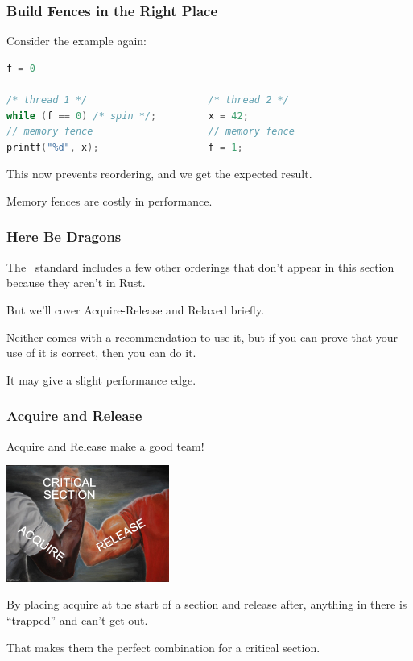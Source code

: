 \begin{frame}[fragile]
\frametitle{Build Fences in the Right Place}

Consider the example again:
  \begin{lstlisting}[language=C]
                         f = 0

/* thread 1 */                     /* thread 2 */
while (f == 0) /* spin */;         x = 42;
// memory fence                    // memory fence
printf("%d", x);                   f = 1;
  \end{lstlisting}
This now prevents reordering, and we get the expected result.

Memory fences are costly in performance.

\end{frame}


\begin{frame}
\frametitle{Here Be Dragons}
The \CPP~standard includes a few other orderings that don't appear in this section because they aren't in Rust. 

But we'll cover Acquire-Release and Relaxed briefly. 

Neither comes with a recommendation to use it, but if you can prove that your use of it is correct, then you can do it. 

It may give a slight performance edge.


\end{frame}


\begin{frame}
\frametitle{Acquire and Release}

Acquire and Release make a good team! 

\begin{center}
	\includegraphics[width=0.4\textwidth]{images/acqrel.jpg}
\end{center}

By placing acquire at the start of a section and release after, anything in there is ``trapped'' and can't get out.

That makes them the perfect combination for a critical section.

\end{frame}


